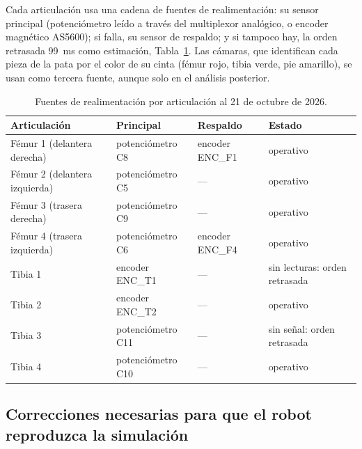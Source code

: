 Cada articulación usa una cadena de fuentes de realimentación: su sensor
principal (potenciómetro leído a través del multiplexor analógico, o encoder
magnético AS5600); si falla, su sensor de respaldo; y si tampoco hay, la orden
retrasada 99~ms como estimación, Tabla~\ref{tab:sensores-articulaciones}. Las
cámaras, que identifican cada pieza de la pata por el color de su cinta (fémur
rojo, tibia verde, pie amarillo), se usan como tercera fuente, aunque solo en el
análisis posterior.

\begin{table}[H]
\centering
\caption{Fuentes de realimentación por articulación al 21 de octubre de 2026.}
\label{tab:sensores-articulaciones}
\footnotesize
\begin{tabular}{llll}
\toprule
Articulación & Principal & Respaldo & Estado \\
\midrule
Fémur 1 (delantera derecha) & potenciómetro C8 & encoder ENC\_F1 & operativo \\
Fémur 2 (delantera izquierda) & potenciómetro C5 & --- & operativo \\
Fémur 3 (trasera derecha) & potenciómetro C9 & --- & operativo \\
Fémur 4 (trasera izquierda) & potenciómetro C6 & encoder ENC\_F4 & operativo \\
Tibia 1 & encoder ENC\_T1 & --- & sin lecturas: orden retrasada \\
Tibia 2 & encoder ENC\_T2 & --- & operativo \\
Tibia 3 & potenciómetro C11 & --- & sin señal: orden retrasada \\
Tibia 4 & potenciómetro C10 & --- & operativo \\
\bottomrule
\end{tabular}
\end{table}

\subsection{Correcciones necesarias para que el robot reproduzca la simulación}

